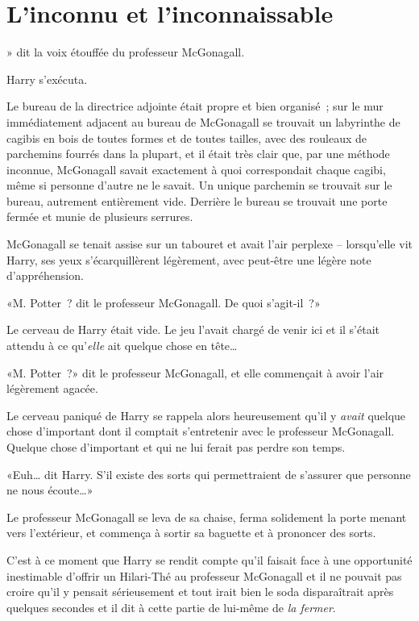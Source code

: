 \chapter{L'inconnu et l'inconnaissable}

» dit la voix étouffée du professeur McGonagall.

\hplettrineextrapara
Harry s'exécuta.

Le bureau de la directrice adjointe était propre et bien organisé~; sur le mur immédiatement adjacent au bureau de McGonagall se trouvait un labyrinthe de cagibis en bois de toutes formes et de toutes tailles, avec des rouleaux de parchemins fourrés dans la plupart, et il était très clair que, par une méthode inconnue, McGonagall savait exactement à quoi correspondait chaque cagibi, même si personne d'autre ne le savait. Un unique parchemin se trouvait sur le bureau, autrement entièrement vide. Derrière le bureau se trouvait une porte fermée et munie de plusieurs serrures.

McGonagall se tenait assise sur un tabouret et avait l'air perplexe -- lorsqu'elle vit Harry, ses yeux s'écarquillèrent légèrement, avec peut-être une légère note d'appréhension.

«M. Potter~? dit le professeur McGonagall. De quoi s'agit-il~?»

Le cerveau de Harry était vide. Le jeu l'avait chargé de venir ici et il s'était attendu à ce qu'\emph{elle} ait quelque chose en tête…

«M. Potter~?» dit le professeur McGonagall, et elle commençait à avoir l'air légèrement agacée.

Le cerveau paniqué de Harry se rappela alors heureusement qu'il y \emph{avait} quelque chose d'important dont il comptait s'entretenir avec le professeur McGonagall. Quelque chose d'important et qui ne lui ferait pas perdre son temps.

«Euh… dit Harry. S'il existe des sorts qui permettraient de s'assurer que personne ne nous écoute…»

Le professeur McGonagall se leva de sa chaise, ferma solidement la porte menant vers l'extérieur, et commença à sortir sa baguette et à prononcer des sorts.

C'est à ce moment que Harry se rendit compte qu'il faisait face à une opportunité inestimable d'offrir un Hilari-Thé au professeur McGonagall et il ne pouvait pas croire qu'il y pensait sérieusement et tout irait bien le soda disparaîtrait après quelques secondes et il dit à cette partie de lui-même de \emph{la fermer}.

